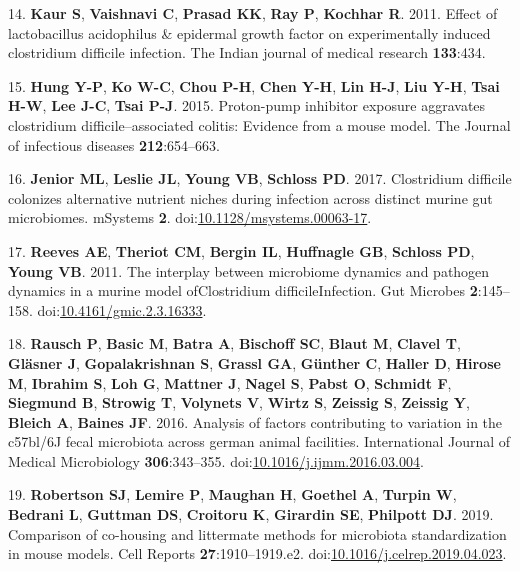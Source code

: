 \documentclass[11pt,]{article}
\begin{document}
\hypertarget{ref-kaur2011effect}{}
14. \textbf{Kaur S}, \textbf{Vaishnavi C}, \textbf{Prasad KK},
\textbf{Ray P}, \textbf{Kochhar R}. 2011. Effect of lactobacillus
acidophilus \& epidermal growth factor on experimentally induced
clostridium difficile infection. The Indian journal of medical research
\textbf{133}:434.

\hypertarget{ref-hung2015proton}{}
15. \textbf{Hung Y-P}, \textbf{Ko W-C}, \textbf{Chou P-H}, \textbf{Chen
Y-H}, \textbf{Lin H-J}, \textbf{Liu Y-H}, \textbf{Tsai H-W}, \textbf{Lee
J-C}, \textbf{Tsai P-J}. 2015. Proton-pump inhibitor exposure aggravates
clostridium difficile--associated colitis: Evidence from a mouse model.
The Journal of infectious diseases \textbf{212}:654--663.

\hypertarget{ref-Jenior2017}{}
16. \textbf{Jenior ML}, \textbf{Leslie JL}, \textbf{Young VB},
\textbf{Schloss PD}. 2017. Clostridium difficile colonizes alternative
nutrient niches during infection across distinct murine gut microbiomes.
mSystems \textbf{2}.
doi:\href{https://doi.org/10.1128/msystems.00063-17}{10.1128/msystems.00063-17}.

\hypertarget{ref-Reeves2011}{}
17. \textbf{Reeves AE}, \textbf{Theriot CM}, \textbf{Bergin IL},
\textbf{Huffnagle GB}, \textbf{Schloss PD}, \textbf{Young VB}. 2011. The
interplay between microbiome dynamics and pathogen dynamics in a murine
model ofClostridium difficileInfection. Gut Microbes
\textbf{2}:145--158.
doi:\href{https://doi.org/10.4161/gmic.2.3.16333}{10.4161/gmic.2.3.16333}.

\hypertarget{ref-Rausch2016}{}
18. \textbf{Rausch P}, \textbf{Basic M}, \textbf{Batra A},
\textbf{Bischoff SC}, \textbf{Blaut M}, \textbf{Clavel T},
\textbf{Gläsner J}, \textbf{Gopalakrishnan S}, \textbf{Grassl GA},
\textbf{Günther C}, \textbf{Haller D}, \textbf{Hirose M},
\textbf{Ibrahim S}, \textbf{Loh G}, \textbf{Mattner J}, \textbf{Nagel
S}, \textbf{Pabst O}, \textbf{Schmidt F}, \textbf{Siegmund B},
\textbf{Strowig T}, \textbf{Volynets V}, \textbf{Wirtz S},
\textbf{Zeissig S}, \textbf{Zeissig Y}, \textbf{Bleich A},
\textbf{Baines JF}. 2016. Analysis of factors contributing to variation
in the c57bl/6J fecal microbiota across german animal facilities.
International Journal of Medical Microbiology \textbf{306}:343--355.
doi:\href{https://doi.org/10.1016/j.ijmm.2016.03.004}{10.1016/j.ijmm.2016.03.004}.

\hypertarget{ref-Robertson2019}{}
19. \textbf{Robertson SJ}, \textbf{Lemire P}, \textbf{Maughan H},
\textbf{Goethel A}, \textbf{Turpin W}, \textbf{Bedrani L},
\textbf{Guttman DS}, \textbf{Croitoru K}, \textbf{Girardin SE},
\textbf{Philpott DJ}. 2019. Comparison of co-housing and littermate
methods for microbiota standardization in mouse models. Cell Reports
\textbf{27}:1910--1919.e2.
doi:\href{https://doi.org/10.1016/j.celrep.2019.04.023}{10.1016/j.celrep.2019.04.023}.
\end{document}

